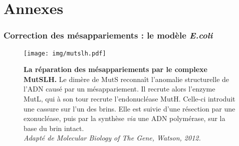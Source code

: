 \newpage
{}

\newpage
{}
\setcounter{page}{1}
\setcounter{lof}{1}
\section*{Annexes}




\subsubsection*{Correction des mésappariements : le modèle {\em E.coli}}
\begin{figure*}[htbp]
  \centering
  \texttt{[image: img/mutslh.pdf]}
  \caption*{{\bf La réparation des mésappariements par le complexe MutSLH.}
    \rmfamily Le dimère de MutS reconnaît l’anomalie structurelle de l’ADN causé
    par un mésappariement. Il recrute alors l’enzyme MutL, qui à son tour
    recrute l’endonucléase MutH. Celle-ci introduit une cassure sur l’un des
    brins. Elle est suivie d’une résection par une exonucléase, puis par la
    synthèse {\em via} une
    ADN polymérase, sur la base du brin intact.\\
    {\em Adapté de Molecular Biology of The Gene, Watson, 2012.}}
  \label{mutslh}
\end{figure*}

\vfill


